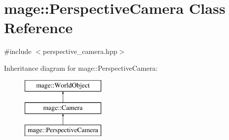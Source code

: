 \hypertarget{classmage_1_1_perspective_camera}{}\section{mage\+:\+:Perspective\+Camera Class Reference}
\label{classmage_1_1_perspective_camera}


{\ttfamily \#include $<$perspective\+\_\+camera.\+hpp$>$}

Inheritance diagram for mage\+:\+:Perspective\+Camera\+:\begin{figure}[H]
\begin{center}
\leavevmode
\includegraphics[height=3.000000cm]{classmage_1_1_perspective_camera}
\end{center}
\end{figure}
